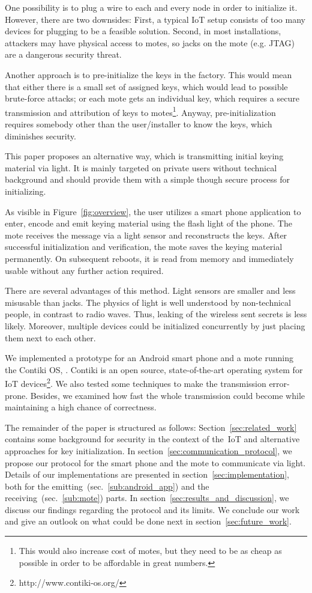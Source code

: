 \documentclass{sig-alternate} %
\begin{document}
One possibility is to plug a wire to each and every node in order to initialize it.
However, there are two downsides: First, a typical IoT setup consists of too many devices for plugging to be a feasible solution. Second, in most installations, attackers may have physical access to motes, so jacks on the mote (e.g. JTAG) are a dangerous security threat.

Another approach is to pre-initialize the keys in the factory.
This would mean that either there is a small set of assigned keys, which would lead to possible brute-force attacks; or each mote gets an individual key, which requires a secure transmission and attribution of keys to motes\footnote{This would also increase cost of motes, but they need to be as cheap as possible in order to be affordable in great numbers.}.
Anyway, pre-initialization requires somebody other than the user/installer to know the keys, which diminishes security.

This paper proposes an alternative way, which is transmitting initial keying material via light.
It is mainly targeted on private users without technical background and should provide them with a simple though secure process for initializing.

As visible in Figure~\ref{fig:overview}, the user utilizes a smart phone application to enter, encode and emit keying material using the flash light of the phone.
The mote receives the message via a light sensor and reconstructs the keys.
After successful initialization and verification, the mote saves the keying material permanently.
On subsequent reboots, it is read from memory and immediately usable without any further action required.

There are several advantages of this method.
Light sensors are smaller and less misusable than jacks.
The physics of light is well understood by non-technical people, in contrast to radio waves.
Thus, leaking of the wireless sent secrets is less likely.
Moreover, multiple devices could be initialized concurrently by just placing them next to each other.

We implemented a prototype for an Android smart phone and a mote running the Contiki OS, \cite{dunkels04contiki}.
Contiki is an open source, state-of-the-art operating system for IoT devices\footnote{http://www.contiki-os.org/}.
We also tested some techniques to make the transmission error-prone.
Besides, we examined how fast the whole transmission could become while maintaining a high chance of correctness.

The remainder of the paper is structured as follows:
Section~\ref{sec:related_work} contains some background for security in the context of the~IoT and alternative approaches for key initialization.
In section~\ref{sec:communication_protocol}, we propose our protocol for the smart phone and the mote to communicate via light.
Details of our implementations are presented in section~\ref{sec:implementation}, both for the emitting~(sec.~\ref{sub:android_app}) and the receiving~(sec.~\ref{sub:mote}) parts.
In section~\ref{sec:results_and_discussion}, we discuss our findings regarding the protocol and its limits.
We conclude our work and give an outlook on what could be done next in section~\ref{sec:future_work}.
\end{document}

